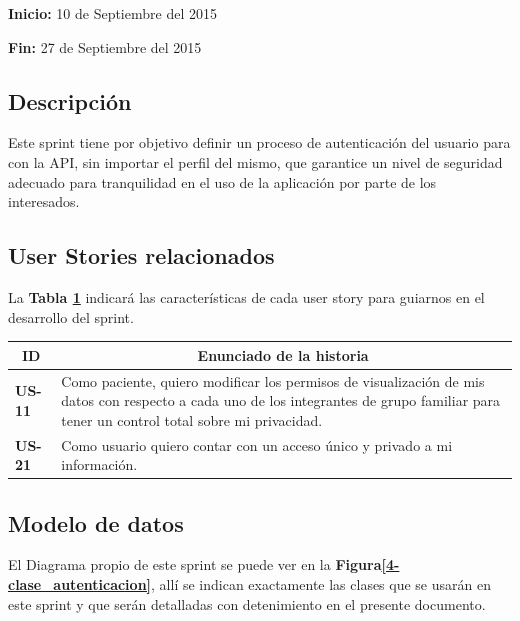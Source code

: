 \documentclass[a4paper,12pt]{article}
\begin{document}
\textbf{Inicio: } 10 de Septiembre del 2015

\textbf{Fin:} 27 de Septiembre del 2015 



\subsection{Descripción}

Este sprint tiene por objetivo definir un proceso de autenticación del usuario para con la API, sin importar el perfil del mismo, que garantice un nivel de seguridad adecuado para tranquilidad en el uso de la aplicación por parte de los interesados. 

\subsection{User Stories relacionados}
La \textbf{Tabla \ref{US-Sprint4} } indicará las características de cada user story para guiarnos en el desarrollo del sprint.

\begin{table}[h]
    \label{US-Sprint4}
    \centering
	\begin{tabular}{|l|p{9cm}|}
	\hline
        \multicolumn{1}{|c|}{\textbf{ID}} &
        \multicolumn{1}{|c|}{\textbf{Enunciado de la historia}} \\          
    \hline
        \textbf{US-11 } & Como paciente, quiero modificar los permisos de visualización de mis datos con respecto a cada uno de los integrantes de grupo familiar para tener un control total sobre mi privacidad. \\
     \hline 
     \hline
        \textbf{US-21 } & Como usuario quiero contar con un acceso único y privado a mi información. \\
     \hline 
     
    \end{tabular}

\end{table}
\subsection{Modelo de datos}
El Diagrama propio de este sprint se puede ver en la \textbf{Figura\ref{4-clase_autenticacion}}, allí se indican exactamente las clases que se usarán en este sprint y que serán detalladas con detenimiento en el presente documento. 
\end{document}
